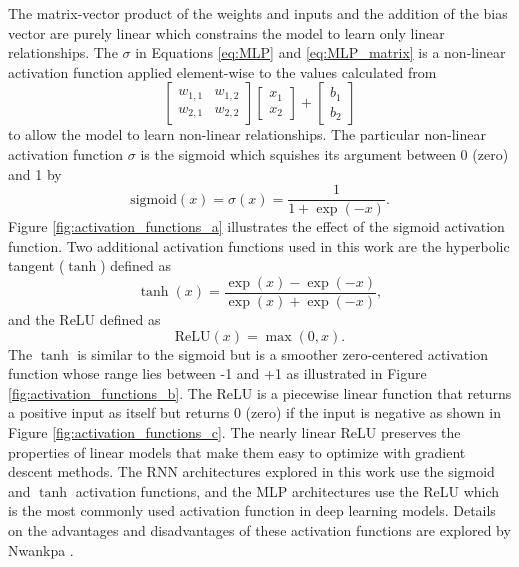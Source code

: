 The matrix-vector product of the weights and inputs and the addition of the bias vector are purely linear which constrains the model to learn only linear relationships. The $\sigma$ in Equations \ref{eq:MLP} and \ref{eq:MLP_matrix} is a non-linear activation function applied element-wise to the values calculated from 
\[
\begin{bmatrix}
	w_{1,1} & w_{1,2} \\
	w_{2,1} & w_{2,2}
\end{bmatrix}
\begin{bmatrix}
	x_{1} \\
	x_{2}
\end{bmatrix}
+
\begin{bmatrix}
	b_{1} \\
	b_{2}
\end{bmatrix}
\]
to allow the model to learn non-linear relationships. The particular non-linear activation function $\sigma$ is the sigmoid which squishes its argument between 0 (zero) and 1 by
\begin{equation} \label{eq:sigmoid}
	\text{sigmoid}\left(x\right) = \sigma \left(x\right) = \frac{1}{1 + \exp \left(-x\right)}.
\end{equation}
Figure \ref{fig:activation_functions_a} \cite{PyTorch} illustrates the effect of the sigmoid activation function. Two additional activation functions used in this work are the hyperbolic tangent ($\tanh$) defined as
\begin{equation} \label{eq:tanh}
	\tanh \left(x\right) = \frac{\exp \left(x\right) - \exp \left(-x\right)}{\exp \left(x\right) + \exp \left(-x\right)},
\end{equation}
and the \ac{ReLU} defined as
\begin{equation} \label{eq:relu}
	\text{ReLU} \left(x\right) = \max \left(0, x\right).
\end{equation}
The $\tanh$ is similar to the sigmoid but is a smoother zero-centered activation function whose range lies between -1 and +1 as illustrated in Figure \ref{fig:activation_functions_b}. The \ac{ReLU} is a piecewise linear function that returns a positive input as itself but returns 0 (zero) if the input is negative as shown in Figure \ref{fig:activation_functions_c}. The nearly linear \ac{ReLU} preserves the properties of linear models that make them easy to optimize with gradient descent methods. The \ac{RNN} architectures explored in this work use the sigmoid and $\tanh$ activation functions, and the \ac{MLP} architectures use the ReLU which is the most commonly used activation function in deep learning models. Details on the advantages and disadvantages of these activation functions are explored by Nwankpa \cite{activationfunctions}.

